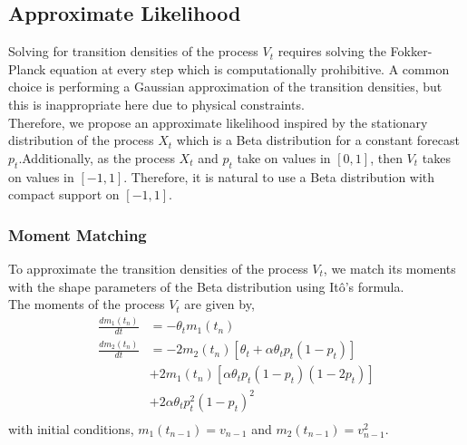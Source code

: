 \documentclass[ima, 20pt, portrait, plainboxedsections]{sciposter}
\newcommand{\E}{\mathbb{E}}
\newcommand{\V}{\mathbb{V}}
\begin{document}
\begin{multicols}{3}
\subsection*{Approximate Likelihood}
Solving for transition densities of the process $V_t$ requires solving the Fokker-Planck equation at every step which is computationally prohibitive. A common choice is performing a  Gaussian approximation of the transition densities, but this is inappropriate here due to physical constraints. \\
 
Therefore, we propose an approximate likelihood inspired by the stationary distribution of the process $X_t$ which is a Beta distribution for a constant forecast $p_t$.Additionally,  as the process $X_t$ and $p_t$ take on values in $[0,1]$, then $V_t$ takes on values in $[-1,1]$. Therefore,  it is natural to use a  Beta distribution with compact support on $[-1,1]$.

%

\subsubsection*{ Moment Matching}
To approximate the transition densities of  the process $V_t$, we match its moments with the shape parameters of the Beta distribution using It\^{o}'s formula. \\

The moments of the process $V_t$ are given by,
\begin{equation}
\begin{split}
 \frac{dm_1(t_n)}{dt} &=    - \theta_t m_1(t_n)  \\
\frac{d m_{2}(t_n)}{dt}&= -2m_{2}(t_n) [\theta_t + \alpha \theta_t p_t(1-p_t) ] \\
&+ 2m_{1}(t_n)[\alpha \theta_t p_t (1-p_t) (1-2p_t)] \\
&+ 2\alpha \theta_t p_t^2(1-p_t)^2  \\
\end{split}
\end{equation}
with initial conditions, $m_1(t_{n-1})= v_{n-1}$ and $m_2(t_{n-1})= v_{n-1}^2$.


\end{multicols}
\end{document}
